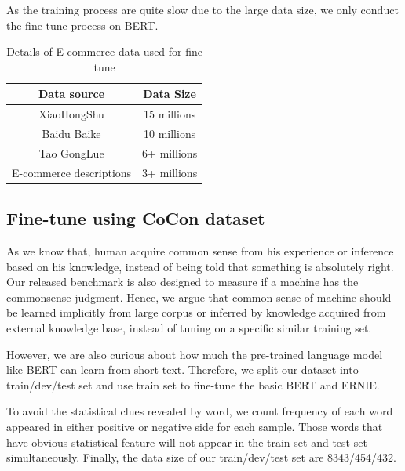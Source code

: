 As the training process are quite slow due to the large data size, we only conduct the fine-tune process on BERT.%

\begin{table}
	\small
	\centering
	\begin{tabular}{cc}
		\toprule[1.1pt]
		Data source & Data Size \\
		\hline
		XiaoHongShu & 15 millions \\
		Baidu Baike & 10 millions \\
		Tao GongLue & 6+ millions \\
		E-commerce descriptions & 3+ millions \\
		\bottomrule[1.1pt]
	\end{tabular}
	\caption{Details of E-commerce data used for fine tune}
	\label{tab:DetailData}
\end{table}

\subsection{Fine-tune using CoCon dataset}
As we know that, human acquire common sense from his experience or inference based on his knowledge, instead of being told that something is absolutely right. Our released benchmark is also designed to measure if a machine has the commonsense judgment. Hence, we argue that common sense of machine should be learned implicitly from large corpus or inferred by knowledge acquired from external knowledge base, instead of tuning on a specific similar training set.

However, we are also curious about how much the pre-trained language model like BERT can learn from short text. Therefore, we split our dataset into train/dev/test set and use train set to fine-tune the basic BERT and ERNIE.

To avoid the statistical clues revealed by word, we count frequency of each word appeared in either positive or negative side for each sample. Those words that have obvious statistical feature will not appear in the train set and test set simultaneously.
Finally, the data size of our train/dev/test set are 8343/454/432. %

